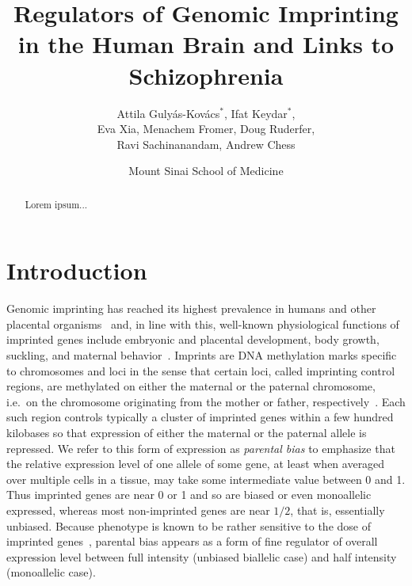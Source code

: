 \documentclass[letterpaper]{article}
\title{Regulators of Genomic Imprinting in the Human Brain and Links to Schizophrenia}
\author{Attila Guly\'{a}s-Kov\'{a}cs\(^\ast\), Ifat Keydar\(^\ast\),\\
Eva Xia, Menachem Fromer, Doug Ruderfer,\\
Ravi Sachinanandam, Andrew Chess}
\date{Mount Sinai School of Medicine}
\begin{document}
\maketitle

\newpage

\maketitle

\begin{abstract}
Lorem ipsum...
\end{abstract}

\section{Introduction}

Genomic imprinting has reached its highest prevalence in humans and other
placental organisms~\cite{Renfree2012} and, in line with this, well-known
physiological functions of imprinted genes include embryonic and placental
development, body growth, suckling, and maternal
behavior~\cite{Plasschaert2014,Peters2014}.  Imprints are DNA methylation
marks specific to chromosomes and loci in the sense that certain loci, called
imprinting control regions, are methylated on either the maternal or the
paternal chromosome, i.e.~on the chromosome originating from the mother or
father, respectively~\cite{Plasschaert2014}.  Each such region controls
typically a cluster of imprinted genes within a few hundred kilobases so that
expression of either the maternal or the paternal allele is repressed.  We
refer to this form of expression as \emph{parental bias} to emphasize that the
relative expression level of one allele of some gene, at least when averaged
over multiple cells in a tissue, may take some intermediate value between 0
and 1.  Thus imprinted genes are near 0 or 1 and so are biased or even
monoallelic expressed, whereas most non-imprinted genes are near \(1/2\), that
is, essentially unbiased.  Because phenotype is known to be rather sensitive
to the dose of imprinted genes~\cite{McNamara2013}, parental bias appears as a
form of fine regulator of overall expression level between full intensity
(unbiased biallelic case) and half intensity (monoallelic case).
\end{document}
